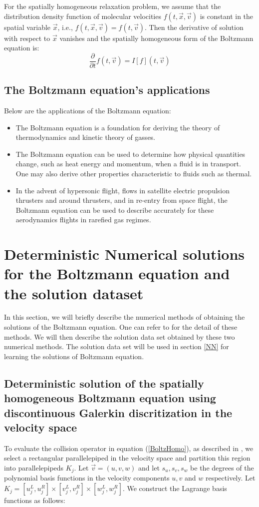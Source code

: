 \documentclass{article}
\begin{document}
For the spatially homogeneous relaxation problem, we assume that the distribution density function of molecular velocities $f(t, \vec{x}, \vec{v})$ is constant in the spatial variable $\vec{x}$, i.e., $f(t, \vec{x}, \vec{v}) = f(t, \vec{v})$. Then the derivative of solution with respect to $\vec{x}$ vanishes and the spatially homogeneous form of the Boltzmann equation is:
\begin{equation}	\label{BoltzHomo}
	\frac{\partial}{\partial t}f(t,\vec{v}) = I[f](t, \vec{v})
\end{equation}
\subsection{The Boltzmann equation's applications}
Below are the applications of the Boltzmann equation:
\begin{itemize}
	\item The Boltzmann equation is a foundation for deriving the theory of thermodynamics and kinetic theory of gasses.
	\item The Boltzmann equation can be used to determine how physical quantities change, such as heat energy and momentum, when a fluid is in transport. One may also derive other properties characteristic to fluids such as thermal.
	\item In the advent of hypersonic flight, flows in satellite electric propulsion thrusters and around thrusters, and in re-entry from space flight, the Boltzmann equation can be used to describe accurately for these aerodynamics flights in rarefied gas regimes.
\end{itemize}

\section{Deterministic Numerical solutions for the Boltzmann equation and the solution dataset} \label{BoltzSol}
In this section, we will briefly describe the numerical methods of obtaining the solutions of the Boltzmann equation. One can refer to \cite{Alekseenko2, Alekseenko4} for the detail of these methods. We will then describe the solution data set obtained by these two numerical methods. The solution data set will be used in section \ref{NN} for learning the solutions of Boltzmann equation.
\subsection{Deterministic solution of the spatially homogeneous Boltzmann equation using discontinuous Galerkin discritization in the velocity space} 
To evaluate the collision operator in equation (\ref{BoltzHomo}), as described in \cite{Alekseenko2}, we select a rectangular parallelepiped in the velocity space  and partition this region into parallelepipeds $K_j$. Let $\vec{v} = (u,v,w)$ and let $s_u, s_v, s_w$ be the degrees of the polynomial basis functions in the velocity components $u, v$ and $w$ respectively. Let $K_j = [u^L_j, u^R_j]\times[v^L_j,v^R_j]\times[w^L_j,w^R_j]$. We construct the Lagrange basis functions as follows:
\end{document}
